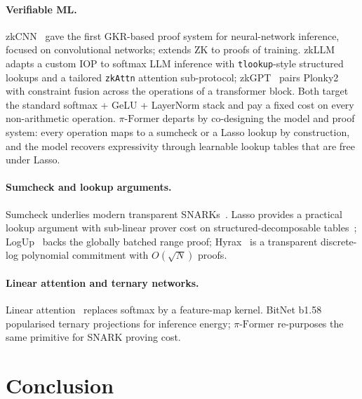 \documentclass[letterpaper,twocolumn,10pt]{article}
\theoremstyle{remark}
\theoremstyle{definition}
\newcommand{\sys}{\ensuremath{\pi\text{-Former}}}
\begin{document}
\paragraph{Verifiable ML.}
zkCNN~\cite{liu2021zkcnn} gave the first GKR-based proof system for
neural-network inference, focused on convolutional networks;
\cite{abbaszadeh2024zero} extends ZK to proofs of training.
zkLLM~\cite{sun2024zkllm} adapts a custom IOP to softmax LLM inference
with \texttt{tlookup}-style structured lookups and a tailored
\texttt{zkAttn} attention sub-protocol; zkGPT~\cite{qu2025zkgpt} pairs
Plonky2 with constraint fusion across the operations of a transformer
block. Both target the standard softmax + GeLU + LayerNorm stack and
pay a fixed cost on every non-arithmetic operation. \sys{} departs by
co-designing the model and proof system: every operation maps to a
sumcheck or a Lasso lookup by construction, and the model recovers
expressivity through learnable lookup tables that are free under Lasso.

\paragraph{Sumcheck and lookup arguments.}
Sumcheck underlies modern transparent SNARKs~\cite{setty2020spartan,thaler2022proofs}.
Lasso provides a practical lookup argument with sub-linear prover cost
on structured-decomposable tables~\cite{setty2024unlocking,arun2024jolt,fomenko2025understanding};
LogUp~\cite{habo2024logup} backs the globally batched range proof;
Hyrax~\cite{wahby2018doubly} is a transparent discrete-log polynomial
commitment with $O(\sqrt N)$ proofs.

\paragraph{Linear attention and ternary networks.}
Linear attention~\cite{katharopoulos2020transformers,wang2020linformer,kitaev2020reformer}
replaces softmax by a feature-map kernel.
BitNet b1.58~\cite{ma2025bitnet} popularised ternary projections for
inference energy; \sys{} re-purposes the same primitive for SNARK
proving cost.

\section{Conclusion}
\label{sec:conclusion}
\end{document}
